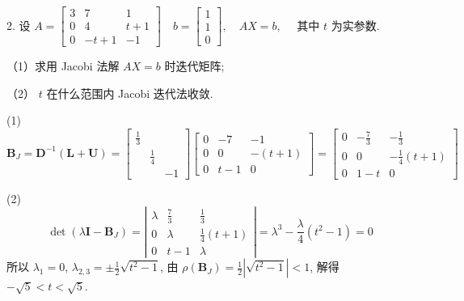 \begin{tcolorbox}[breakable,
		colframe=white!10!jingga, coltitle=white!90!jingga, colback=white!95!jingga, coltext=black, colbacktitle=white!10!jingga, enhanced, fonttitle=\bfseries,fontupper=\normalsize, attach boxed title to top left={yshift=-2mm}, before skip=8pt, after skip=8pt,
		title=解答题]

2. 设 $ A=\left[\begin{array}{ccc}3 & 7 & 1 \\ 0 & 4 & t+1 \\ 0 & -t+1 & -1\end{array}\right] \quad b=\left[\begin{array}{l}1 \\ 1 \\ 0\end{array}\right], \quad A X=b, \quad $ 其中 $ t $ 为实参数.

（1）求用 Jacobi 法解 $ A X=b $ 时迭代矩阵;

（2） $ t $ 在什么范围内 Jacobi 迭代法收敛.

\tcblower
(1)
$$
\boldsymbol{B}_{J}=\boldsymbol{D}^{-1}(\boldsymbol{L}+\boldsymbol{U})=\left[\begin{array}{ccc}
\frac{1}{3} &  &  \\
 & \frac{1}{4} &  \\
 &  & -1
\end{array}\right]\left[\begin{array}{ccc}
0 & -7 & -1 \\
0 & 0 & -(t+1) \\
0 & t-1 & 0
\end{array}\right]=\left[\begin{array}{ccc}
0 & -\frac{7}{3} & -\frac{1}{3} \\
0 & 0 & -\frac{1}{4}(t+1) \\
0 & 1-t & 0
\end{array}\right]
$$

(2)
$$\operatorname{det}\left(\lambda \boldsymbol{I}-\boldsymbol{B}_{J}\right)=\left|\begin{array}{ccc}
\lambda & \frac{7}{3} & \frac{1}{3} \\
0 & \lambda & \frac{1}{4}(t+1) \\
0 & t-1 & \lambda
\end{array}\right|=\lambda^{3}-\frac{\lambda}{4}\left(t^{2}-1\right)=0$$
所以 $ \lambda_1=0 $, $ \lambda_{2,3}=\pm\frac{1}{2} \sqrt{t^{2}-1} $, 由 $ \rho\left(\boldsymbol{B}_{J}\right)=\frac{1}{2} |\sqrt{t^{2}-1}|<1 $, 解得 $  -\sqrt{5}<t<\sqrt{5} $.

\end{tcolorbox}




